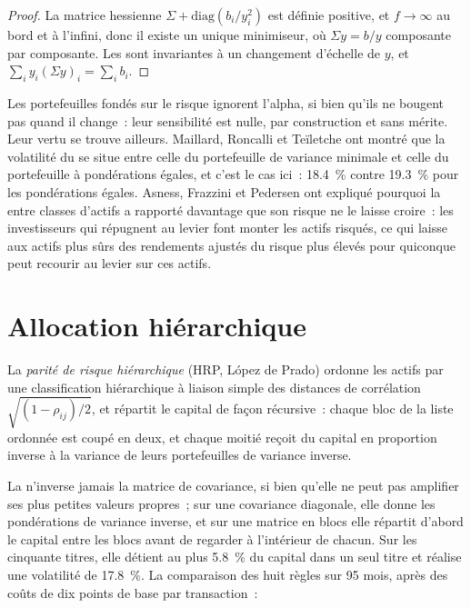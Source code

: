 \begin{proof}
La matrice hessienne $\Sigma + \mathrm{diag}(b_i/y_i^2)$ est définie positive, et $f \to \infty$ au bord et à l'infini, donc il existe un unique minimiseur, où
$\Sigma y = b/y$ composante par composante. Les  sont invariantes à un changement d'échelle de $y$, et $\sum_i y_i(\Sigma y)_i = \sum_i b_i$.
\end{proof}

Les portefeuilles fondés sur le risque ignorent l'alpha, si bien qu'ils ne bougent pas quand il change~: leur sensibilité est nulle, par construction et sans mérite. Leur vertu se trouve ailleurs.
Maillard, Roncalli et Teïletche ont montré que la volatilité du  se situe entre celle du portefeuille de variance minimale et
celle du portefeuille à pondérations égales, et c'est le cas ici~: 18.4~\% contre 19.3~\% pour les pondérations égales. Asness, Frazzini et Pedersen ont expliqué pourquoi la  entre classes d'actifs a
rapporté davantage que son risque ne le laisse croire~: les investisseurs qui répugnent au levier font monter les actifs risqués, ce qui laisse aux actifs plus sûrs des rendements ajustés du risque plus élevés pour quiconque
peut recourir au levier sur ces actifs.

\section{Allocation hiérarchique}

\begin{definition}\label{def:rs:portfolio-construction-ii:hrp}
La \emph{parité de risque hiérarchique} (HRP, López de Prado) ordonne les actifs par une classification hiérarchique à liaison simple des distances de corrélation
$\sqrt{(1-\rho_{ij})/2}$, et répartit le capital de façon récursive~: chaque bloc de la liste ordonnée est coupé en deux, et chaque moitié reçoit du capital en proportion inverse
à la variance de leurs portefeuilles de variance inverse.
\end{definition}

La  n'inverse jamais la matrice de covariance, si bien qu'elle ne peut pas amplifier ses plus petites valeurs propres~; sur une covariance diagonale, elle donne les
pondérations de variance inverse, et sur une matrice en blocs elle répartit d'abord le capital entre les blocs avant de regarder à l'intérieur de chacun. Sur les cinquante titres, elle détient au plus
5.8~\% du capital dans un seul titre et réalise une volatilité de 17.8~\%. La comparaison des huit règles sur 95 mois, après des coûts de dix points de base par transaction~:


